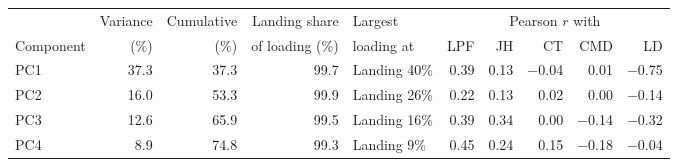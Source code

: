 \begin{tabular}{lrrrlrrrrr}
\toprule
 & Variance & Cumulative & Landing share & Largest & \multicolumn{5}{c}{Pearson $r$ with} \\
\cmidrule(l){6-10}
Component & (\%) & (\%) & of loading (\%) & loading at & LPF & JH & CT & CMD & LD \\
\midrule
PC1 & 37.3 & 37.3 & 99.7 & Landing 40\% & 0.39 & 0.13 & $-$0.04 & 0.01 & $-$0.75 \\
PC2 & 16.0 & 53.3 & 99.9 & Landing 26\% & 0.22 & 0.13 & 0.02 & 0.00 & $-$0.14 \\
PC3 & 12.6 & 65.9 & 99.5 & Landing 16\% & 0.39 & 0.34 & 0.00 & $-$0.14 & $-$0.32 \\
PC4 & 8.9 & 74.8 & 99.3 & Landing 9\% & 0.45 & 0.24 & 0.15 & $-$0.18 & $-$0.04 \\
\bottomrule
\end{tabular}
